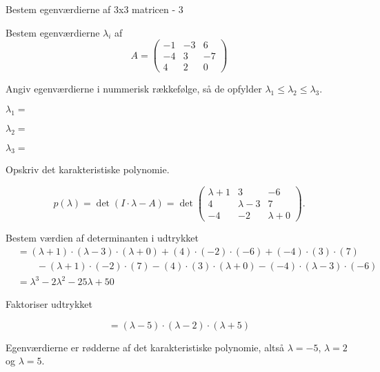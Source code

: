 \documentclass{article}
\begin{document}
\begin{exercise}{Bestem egenværdierne af 3x3 matricen - 3}

Bestem egenværdierne $\lambda_i$ af 
\[
A=\begin{pmatrix}
-1 & -3 & 6 \\
-4 & 3 & -7 \\
4 & 2 & 0
\end{pmatrix}
\]

Angiv egenværdierne i nummerisk rækkefølge, så de
opfylder $\lambda_1 \le \lambda_2 \le \lambda_3$.

$\lambda_1 = $ 

$\lambda_2 = $ 

$\lambda_3 = $ 

\hint
Opskriv det karakteristiske polynomie.

\hint
\[
p(\lambda)=\det\left(I \cdot \lambda - A \right)=\det\begin{pmatrix}
\lambda + 1 & 3 & -6 \\
4 & \lambda - 3 & 7 \\
-4 & -2 & \lambda + 0
\end{pmatrix}.
\]

\hint
Bestem værdien af determinanten i udtrykket
\begin{align*}
&=(\lambda+1) \cdot (\lambda-3) \cdot (\lambda+0)+(4) \cdot (-2) \cdot (-6)+(-4) \cdot (3) \cdot (7) \\
&\qquad -(\lambda+1) \cdot (-2) \cdot (7)-(4) \cdot (3) \cdot (\lambda+0)-(-4) \cdot (\lambda-3) \cdot (-6) \\
&=\lambda^3-2\lambda^2-25\lambda+50
\end{align*}

\hint
Faktoriser udtrykket

\hint
\[
=(\lambda-5) \cdot (\lambda-2) \cdot (\lambda+5)
\]

\hint
Egenværdierne er rødderne af det karakteristiske polynomie, 
altså
$\lambda=-5$, $\lambda=2$ og $\lambda=5$.

\end{exercise}
\end{document}

